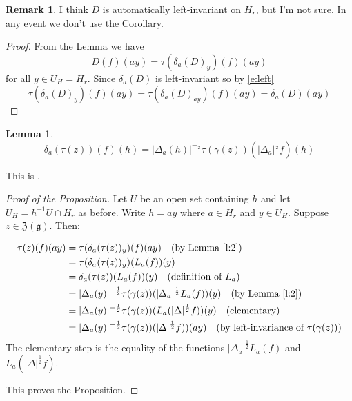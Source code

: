 \documentclass{article}
\newtheorem{lem}[thm]{Lemma}
\theoremstyle{definition}
\newtheorem{rem}[thm]{Remark}
\numberwithin{equation}{section}
\renewcommand{\-}{\hyp{}}
\newcommand{\inv}{^{-1}}
\newcommand{\z}{\mathfrak Z}
\newcommand{\g}{\mathfrak g}
\begin{document}
\begin{rem}
I think $D$ is automatically left-invariant on $H_r$, but I'm not sure. In any event we don't use the Corollary.
\end{rem}

\begin{proof}
  From the Lemma we have
  $$
  D(f)(ay)=\tau(\delta_a(D)_y)(f)(ay)
  $$
  for all $y\in U_H=H_r$. Since $\delta_a(D)$ is left-invariant so by \eqref{e:left}
  $$
  \tau(\delta_a(D)_y)(f)(ay)=  \tau(\delta_a(D)_{ay})(f)(ay)=\delta_a(D)(ay)
  $$
\end{proof}

\begin{lem}
\label{l:2}
$$
\delta_a(\tau(z))(f)(h)=|\Delta_a(h)|^{-\frac12}\tau(\gamma(z))(|\Delta_a|^{\frac12}f)(h)
$$
\end{lem}
This is \cite[Lemma 13]{HC_inv_eigen}.

\begin{proof}[Proof of the Proposition]

Let $U$ be an open set containing $h$ and let $U_H=h\inv U\cap H_r$ as before. 
Write $h=ay$ where $a\in H_r$ and $y\in U_H$.
Suppose $z\in\z(\g)$. Then:

$$
\begin{aligned}
  \tau(z)(f)(ay)&=\tau(\delta_a(\tau(z))_y)(f)(ay)\quad\text{(by Lemma \ref{l:2})}\\
&=  \tau(\delta_a(\tau(z))_y)(L_a(f))(y)\\
 &= \delta_a(\tau(z))(L_a(f))(y)\quad\text{(definition of $L_a$)}\\
 &= |\Delta_a(y)|^{-\frac12}\tau(\gamma(z))(|\Delta_a|^{\frac12}L_a(f))(y)\quad\text{(by Lemma \ref{l:2})}\\
 &= |\Delta_a(y)|^{-\frac12}\tau(\gamma(z))(L_a(|\Delta|^{\frac12}f))(y)\quad\text{(elementary)}\\
   &= |\Delta_a(y)|^{-\frac12}\tau(\gamma(z))(|\Delta|^{\frac12}f))(ay)\quad\text{(by left-invariance of $\tau(\gamma(z))$)}
\end{aligned}
$$
The elementary step is the equality of the functions $|\Delta_a|^{\frac12}L_a(f)$ 
and
 $L_a(|\Delta|^{\frac12}f)$.

This proves the Proposition.
\end{proof}





%

\end{document}
